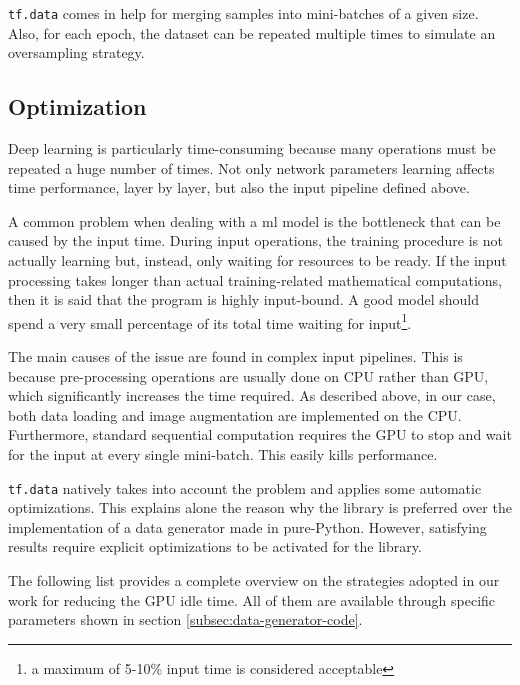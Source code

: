 \texttt{tf.data} comes in help for merging samples into mini-batches of a given size. Also, for each epoch, the dataset can be repeated multiple times to simulate an oversampling strategy.



\subsection{Optimization}

Deep learning is particularly time-consuming because many operations must be repeated a huge number of times. Not only network parameters learning affects time performance, layer by layer, but also the input pipeline defined above.

A common problem when dealing with a \gls{ml} model is the bottleneck that can be caused by the input time. During input operations, the training procedure is not actually learning but, instead, only waiting for resources to be ready. If the input processing takes longer than actual training-related mathematical computations, then it is said that the program is highly input-bound. A good model should spend a very small percentage of its total time waiting for input\footnote{a maximum of 5-10\% input time is considered acceptable}.

\medskip

The main causes of the issue are found in complex input pipelines. This is because pre-processing operations are usually done on CPU rather than GPU, which significantly increases the time required. As described above, in our case, both data loading and image augmentation are implemented on the CPU. Furthermore, standard sequential computation requires the GPU to stop and wait for the input at every single mini-batch. This easily kills performance.

\texttt{tf.data} natively takes into account the problem and applies some automatic optimizations. This explains alone the reason why the library is preferred over the implementation of a data generator made in pure-Python. However, satisfying results require explicit optimizations to be activated for the library.

The following list provides a complete overview on the strategies adopted in our work for reducing the GPU idle time. All of them are available through specific parameters shown in section \ref{subsec:data-generator-code}.

